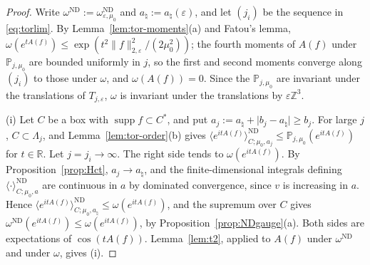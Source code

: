 \documentclass[11pt]{amsart}
\theoremstyle{plain}
\theoremstyle{definition}
\theoremstyle{remark}
\numberwithin{equation}{section}
\newcommand{\R}{\mathbb{R}}
\newcommand{\Z}{\mathbb{Z}}
\newcommand{\eps}{\varepsilon}
\newcommand{\abs}[1]{\lvert #1\rvert}
\newcommand{\norm}[1]{\lVert #1\rVert}
\newcommand{\ev}[1]{\langle #1\rangle}
\DeclareMathOperator{\supp}{supp}
\begin{document}
\begin{proof}
Write $\omega^{\mathrm{ND}}:=\omega^{\mathrm{ND}}_{\eps,\mu_0}$ and $a_\natural:=a_\natural(\eps)$, and let $(j_i)$ be the sequence in \eqref{eq:torlim}. By Lemma~\ref{lem:tor-moments}(a) and Fatou's lemma, $\omega(e^{tA(f)})\le\exp(t^2\norm f^2_{2,\eps}/(2\mu_0^2))$; the fourth moments of $A(f)$ under $\mathbb P_{j,\mu_0}$ are bounded uniformly in $j$, so the first and second moments converge along $(j_i)$ to those under $\omega$, and $\omega(A(f))=0$. Since the $\mathbb P_{j,\mu_0}$ are invariant under the translations of $T_{j,\eps}$, $\omega$ is invariant under the translations by $\eps\Z^3$.

(i) Let $C$ be a box with $\supp f\subset C^*$, and put $a_j:=a_\natural+\abs{b_j-a_\natural}\ge b_j$. For large $j$, $C\subset\Lambda_j$, and Lemma~\ref{lem:tor-order}(b) gives $\ev{e^{itA(f)}}^{\mathrm{ND}}_{C;\mu_0,a_j}\le\mathbb P_{j,\mu_0}(e^{itA(f)})$ for $t\in\R$. Let $j=j_i\to\infty$. The right side tends to $\omega(e^{itA(f)})$. By Proposition~\ref{prop:Hct}, $a_j\to a_\natural$, and the finite-dimensional integrals defining $\ev\cdot^{\mathrm{ND}}_{C;\mu_0,a}$ are continuous in $a$ by dominated convergence, since $v$ is increasing in $a$. Hence $\ev{e^{itA(f)}}^{\mathrm{ND}}_{C;\mu_0,a_\natural}\le\omega(e^{itA(f)})$, and the supremum over $C$ gives $\omega^{\mathrm{ND}}(e^{itA(f)})\le\omega(e^{itA(f)})$, by Proposition~\ref{prop:NDgauge}(a). Both sides are expectations of $\cos(tA(f))$. Lemma~\ref{lem:t2}, applied to $A(f)$ under $\omega^{\mathrm{ND}}$ and under $\omega$, gives (i).


\end{proof}
\end{document}
